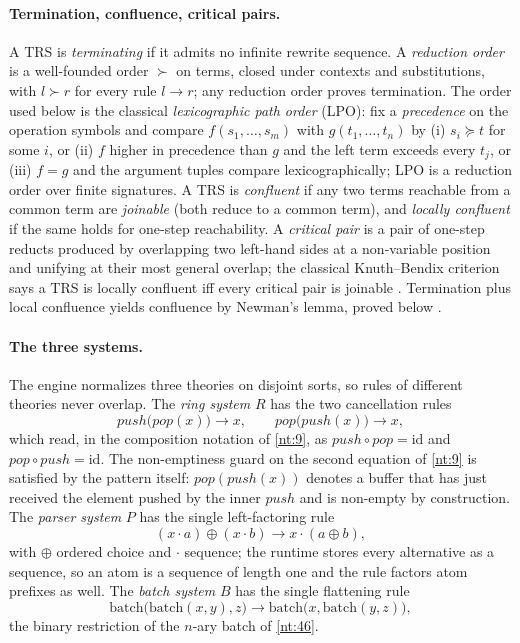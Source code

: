 \paragraph{Termination, confluence, critical pairs.}
A TRS is \emph{terminating} if it admits no infinite rewrite sequence. A
\emph{reduction order} is a well-founded order $\succ$ on terms, closed
under contexts and substitutions, with $l \succ r$ for every rule $l \to r$;
any reduction order proves termination. The order used below is the
classical \emph{lexicographic path order} (LPO): fix a \emph{precedence} on
the operation symbols and compare $f(s_1, \ldots, s_m)$ with
$g(t_1, \ldots, t_n)$ by (i) $s_i \succeq t$ for some $i$, or (ii) $f$
higher in precedence than $g$ and the left term exceeds every $t_j$, or
(iii) $f = g$ and the argument tuples compare lexicographically; LPO is a
reduction order over finite signatures. A TRS is \emph{confluent} if any
two terms reachable from a common term are \emph{joinable} (both reduce to
a common term), and \emph{locally confluent} if the same holds for one-step
reachability. A \emph{critical pair} is a pair of one-step reducts produced
by overlapping two left-hand sides at a non-variable position and unifying
at their most general overlap; the classical Knuth--Bendix criterion says a
TRS is locally confluent iff every critical pair is joinable
\cite{knuthbendix}. Termination plus local confluence yields confluence by
Newman's lemma, proved below \cite{newman}.

\paragraph{The three systems.}
The engine normalizes three theories on disjoint sorts, so rules of
different theories never overlap. The \emph{ring system} $R$ has the two
cancellation rules
\[
\mathit{push}\bigl(\mathit{pop}(x)\bigr) \to x, \qquad
\mathit{pop}\bigl(\mathit{push}(x)\bigr) \to x ,
\]
which read, in the composition notation of \autoref{nt:9}, as
$\mathit{push}\circ\mathit{pop} = \mathrm{id}$ and
$\mathit{pop}\circ\mathit{push} = \mathrm{id}$. The non-emptiness guard on
the second equation of \autoref{nt:9} is satisfied by the pattern itself:
$\mathit{pop}(\mathit{push}(x))$ denotes a buffer that has just received
the element pushed by the inner $\mathit{push}$ and is non-empty by
construction. The \emph{parser system} $P$ has the single left-factoring
rule
\[
(x \cdot a) \oplus (x \cdot b) \to x \cdot (a \oplus b) ,
\]
with $\oplus$ ordered choice and $\cdot$ sequence; the runtime stores every
alternative as a sequence, so an atom is a sequence of length one and the
rule factors atom prefixes as well. The \emph{batch system} $B$ has the
single flattening rule
\[
\mathrm{batch}\bigl(\mathrm{batch}(x,y), z\bigr) \to
\mathrm{batch}\bigl(x, \mathrm{batch}(y,z)\bigr),
\]
the binary restriction of the $n$-ary batch of \autoref{nt:46}.

